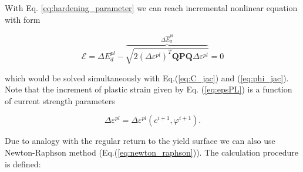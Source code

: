 With Eq. \ref{eq:hardening_parameter} we can reach incremental nonlinear equation with form

\begin{equation}
	\mathcal{E} = \Delta E_d^{pl} - \overbrace{\sqrt{2(\Delta \varepsilon^{pl})^T \textbf{QPQ}\Delta\varepsilon^{pl}} }^{\Delta \hat{E}_d^{pl}}=0
\end{equation}

which would be solved simultaneously with Eq.(\ref{eq:C_jac}) and (\ref{eq:phi_jac}). Note that the increment of plastic strain given by Eq. (\ref{eq:epsPL}) is a function of current strength parameters

\begin{equation}
	\Delta\varepsilon^{pl} = \Delta\varepsilon^{pl} (c^{i+1}, \varphi^{i+1}).
\end{equation}

Due to analogy with the regular return to the yield surface we can also use Newton-Raphson method (Eq.(\ref{eq:newton_raphson})). The calculation procedure is defined:

